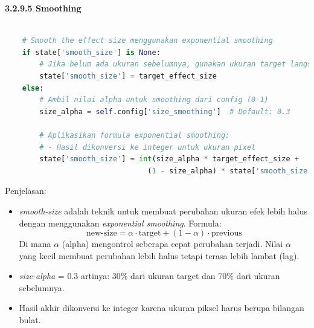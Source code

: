 \documentclass[11pt,a4paper]{article}
\begin{document}
    \noindent\textbf{3.2.9.5 Smoothing}
    \begin{lstlisting}[language=Python, caption=Smoothing Ukuran]
        
    # Smooth the effect size menggunakan exponential smoothing
    if state['smooth_size'] is None:
        # Jika belum ada ukuran sebelumnya, gunakan ukuran target langsung
        state['smooth_size'] = target_effect_size
    else:
        # Ambil nilai alpha untuk smoothing dari config (0-1)
        size_alpha = self.config['size_smoothing']  # Default: 0.3
        
        # Aplikasikan formula exponential smoothing:
        # - Hasil dikonversi ke integer untuk ukuran pixel
        state['smooth_size'] = int(size_alpha * target_effect_size + 
                                 (1 - size_alpha) * state['smooth_size'])
    \end{lstlisting}
    Penjelasan: 
    \begin{itemize}
        \item \textit{smooth-size} adalah teknik untuk membuat perubahan ukuran efek lebih halus dengan menggunakan \textit{exponential smoothing}. Formula:
        \[
        \text{new-size} = \alpha \cdot \text{target} + (1 - \alpha) \cdot \text{previous}
        \]
        Di mana $\alpha$ (alpha) mengontrol seberapa cepat perubahan terjadi. Nilai $\alpha$ yang kecil membuat perubahan lebih halus tetapi terasa lebih lambat (lag).
        
        \item \textit{size-alpha} = 0.3 artinya: 30\% dari ukuran target dan 70\% dari ukuran sebelumnya.
        
        \item Hasil akhir dikonversi ke integer karena ukuran piksel harus berupa bilangan bulat.
    \end{itemize}
\end{document}

